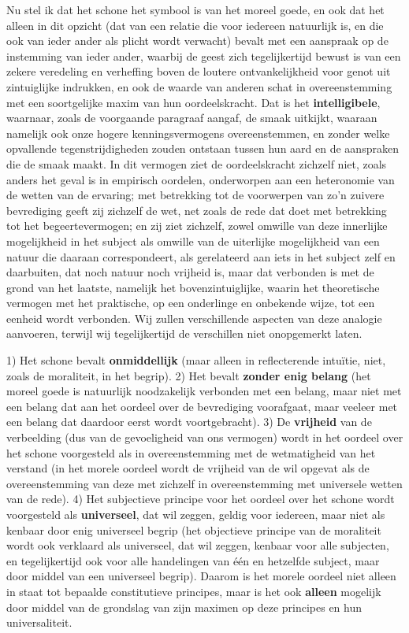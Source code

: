 Nu stel ik dat het schone het symbool is van het moreel goede, en ook dat het alleen in dit opzicht (dat van een relatie die voor iedereen natuurlijk is, en die ook van ieder ander als plicht wordt verwacht) bevalt met een aanspraak op de instemming van ieder ander, waarbij de geest zich tegelijkertijd bewust is van een zekere veredeling en verheffing boven de loutere ontvankelijkheid voor genot uit zintuiglijke indrukken, en ook de waarde van anderen schat in overeenstemming met een soortgelijke maxim van hun oordeelskracht. Dat is het \textbf{intelligibele}, waarnaar, zoals de voorgaande paragraaf aangaf, de smaak uitkijkt, waaraan namelijk ook onze hogere kenningsvermogens overeenstemmen, en zonder welke opvallende tegenstrijdigheden zouden ontstaan tussen hun aard en de aanspraken die de smaak maakt. In dit vermogen ziet de oordeelskracht zichzelf niet, zoals anders het geval is in empirisch oordelen, onderworpen aan een heteronomie van de wetten van de ervaring; met betrekking tot de voorwerpen van zo'n zuivere bevrediging geeft zij zichzelf de wet, net zoals de rede dat doet met betrekking tot het begeertevermogen; en zij ziet zichzelf, zowel omwille van deze innerlijke mogelijkheid in het subject als omwille van de uiterlijke mogelijkheid van een natuur die daaraan correspondeert, als gerelateerd aan iets in het subject zelf en daarbuiten, dat noch natuur noch vrijheid is, maar dat verbonden is met de grond van het laatste, namelijk het bovenzintuiglijke, waarin het theoretische vermogen met het praktische, op een onderlinge en onbekende wijze, tot een eenheid wordt verbonden. Wij zullen verschillende aspecten van deze analogie aanvoeren, terwijl wij tegelijkertijd de verschillen niet onopgemerkt laten.

1) Het schone bevalt \textbf{onmiddellijk} (maar alleen in reflecterende intuïtie, niet, zoals de moraliteit, in het begrip). 2) Het bevalt \textbf{zonder enig belang} (het moreel goede is natuurlijk noodzakelijk verbonden met een belang, maar niet met een belang dat aan het oordeel over de bevrediging voorafgaat, maar veeleer met een belang dat daardoor eerst wordt voortgebracht). 3) De \textbf{vrijheid} van de verbeelding (dus van de gevoeligheid van ons vermogen) wordt in het oordeel over het schone voorgesteld als in overeenstemming met de wetmatigheid van het verstand (in het morele oordeel wordt de vrijheid van de wil opgevat als de overeenstemming van deze met zichzelf in overeenstemming met universele wetten van de rede). 4) Het subjectieve principe voor het oordeel over het schone wordt voorgesteld als \textbf{universeel}, dat wil zeggen, geldig voor iedereen, maar niet als kenbaar door enig universeel begrip (het objectieve principe van de moraliteit wordt ook verklaard als universeel, dat wil zeggen, kenbaar voor alle subjecten, en tegelijkertijd ook voor alle handelingen van één en hetzelfde subject, maar door middel van een universeel begrip). Daarom is het morele oordeel niet alleen in staat tot bepaalde constitutieve principes, maar is het ook \textbf{alleen} mogelijk door middel van de grondslag van zijn maximen op deze principes en hun universaliteit.

